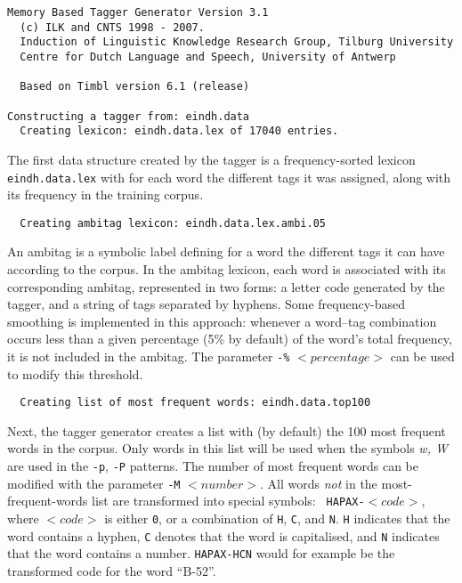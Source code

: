 \documentclass{report}
\begin{document}
{\small
\begin{verbatim}
Memory Based Tagger Generator Version 3.1
  (c) ILK and CNTS 1998 - 2007.
  Induction of Linguistic Knowledge Research Group, Tilburg University
  Centre for Dutch Language and Speech, University of Antwerp

  Based on Timbl version 6.1 (release)

Constructing a tagger from: eindh.data
  Creating lexicon: eindh.data.lex of 17040 entries.
\end{verbatim}
}

The first data structure created by the tagger is a frequency-sorted
lexicon {\tt eindh.data.lex} with for each word the different tags it
was assigned, along with its frequency in the training corpus. 

{\small
\begin{verbatim}
  Creating ambitag lexicon: eindh.data.lex.ambi.05
\end{verbatim}
}

An ambitag is a symbolic label defining for a word the different
tags it can have according to the corpus.  In the ambitag lexicon,
each word is associated with its corresponding ambitag, represented in
two forms: a letter code generated by the tagger, and a string of tags
separated by hyphens. Some frequency-based smoothing is implemented in
this approach: whenever a word--tag combination occurs less than a
given percentage (5\% by default) of the word's total frequency, it is
not included in the ambitag. The parameter {\tt -\%} $<percentage>$ can be
used to modify this threshold. 

{\small
\begin{verbatim}
  Creating list of most frequent words: eindh.data.top100
\end{verbatim}
}

Next, the tagger generator creates a list with (by default) the 100
most frequent words in the corpus. Only words in this list will be
used when the symbols {\em w, W} are used in the {\tt -p}, {\tt -P}
patterns. The number of most frequent words can be modified with the
parameter {\tt -M} $<number>$. All words {\em not}\/ in the
most-frequent-words list are transformed into special symbols: {\tt
HAPAX-}$<code>$, where $<code>$ is either {\tt 0}, or a combination of
{\tt H}, {\tt C}, and {\tt N}. {\tt H} indicates that the word
contains a hyphen, {\tt C} denotes that the word is capitalised, and
{\tt N} indicates that the word contains a number. {\tt HAPAX-HCN}
would for example be the transformed code for the word ``B-52''.
\end{document}
